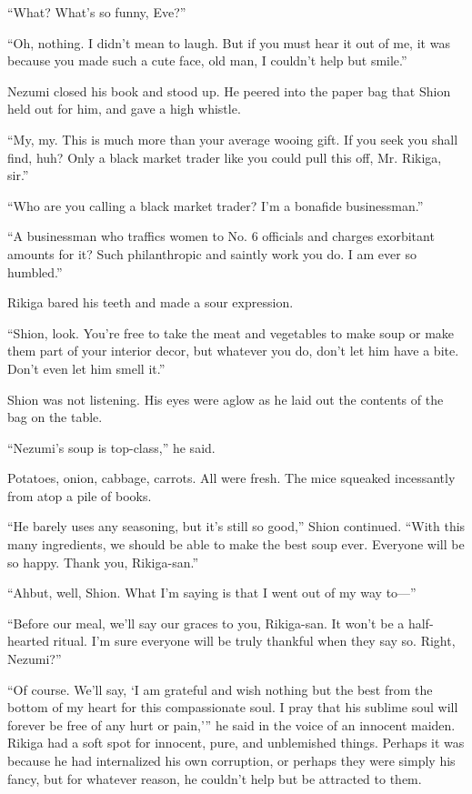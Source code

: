 ``What? What's so funny, Eve?''

``Oh, nothing. I didn't mean to laugh. But if you must hear it out of
me, it was because you made such a cute face, old man, I couldn't help
but smile.''

Nezumi closed his book and stood up. He peered into the paper bag that
Shion held out for him, and gave a high whistle.

``My, my. This is much more than your average wooing gift. If you seek
you shall find, huh? Only a black market trader like you could pull this
off, Mr. Rikiga, sir.''

``Who are you calling a black market trader? I'm a bonafide
businessman.''

``A businessman who traffics women to No. 6 officials and charges
exorbitant amounts for it? Such philanthropic and saintly work you do. I
am ever so humbled.''

Rikiga bared his teeth and made a sour expression.

``Shion, look. You're free to take the meat and vegetables to make soup
or make them part of your interior decor, but whatever you do, don't let
him have a bite. Don't even let him smell it.''

Shion was not listening. His eyes were aglow as he laid out the contents
of the bag on the table.

``Nezumi's soup is top-class,'' he said.

Potatoes, onion, cabbage, carrots. All were fresh. The mice squeaked
incessantly from atop a pile of books.

``He barely uses any seasoning, but it's still so good,'' Shion
continued. ``With this many ingredients, we should be able to make the
best soup ever. Everyone will be so happy. Thank you, Rikiga-san.''

``Ah\el but, well, Shion. What I'm saying is that I went out of my way
to---''

``Before our meal, we'll say our graces to you, Rikiga-san. It won't be
a half-hearted ritual. I'm sure everyone will be truly thankful when
they say so. Right, Nezumi?''

``Of course. We'll say, `I am grateful and wish nothing but the best
from the bottom of my heart for this compassionate soul. I pray that his
sublime soul will forever be free of any hurt or pain,''' he said in the
voice of an innocent maiden. Rikiga had a soft spot for innocent, pure,
and unblemished things. Perhaps it was because he had internalized his
own corruption, or perhaps they were simply his fancy, but for whatever
reason, he couldn't help but be attracted to them.

